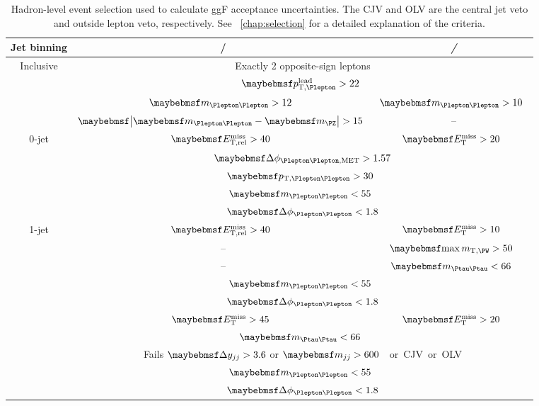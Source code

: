 \begin{table}
	\begin{tabular}{ccc}
		Jet binning & \ee/\mm & \em/\me \\
		\hline
		Inclusive & \multicolumn{2}{c}{Exactly 2 opposite-sign leptons} \\
		& \multicolumn{2}{c}{\unit{$\ptleadlep > 22$}{\GeV}} \\
		& \unit{$\mll > 12$}{\GeV} & \unit{$\mll > 10$}{\GeV} \\
		& \unit{$\mods{\mll - \mZ} > 15$}{\GeV} & -- \\
		\hline
		0-jet & \unit{$\metrel > 40$}{\GeV} & \unit{$\met > 20$}{\GeV} \\
		& \multicolumn{2}{c}{$\dphillmet > 1.57$} \\
		& \multicolumn{2}{c}{\unit{$\ptll > 30$}{\GeV}} \\
		& \multicolumn{2}{c}{\unit{$\mll < 55$}{\GeV}} \\
		& \multicolumn{2}{c}{$\dphill < 1.8$} \\
		\hline
		1-jet & \unit{$\metrel > 40$}{\GeV} & \unit{$\met > 10$}{\GeV} \\
		& -- & \unit{$\maxmtw > 50$}{\GeV} \\
		& -- & \unit{$\mtautau < 66$}{\GeV} \\
		& \multicolumn{2}{c}{\unit{$\mll < 55$}{\GeV}} \\
		& \multicolumn{2}{c}{$\dphill < 1.8$} \\
		\hline
		\twojet & \unit{$\met > 45$}{\GeV} & \unit{$\met > 20$}{\GeV} \\
		& \multicolumn{2}{c}{\unit{$\mtautau < 66$}{\GeV}} \\
		& \multicolumn{2}{c}{Fails $\dyjj > 3.6$ or \unit{$\mjj > 600$}{\GeV} or CJV or OLV} \\
		& \multicolumn{2}{c}{\unit{$\mll < 55$}{\GeV}} \\
		& \multicolumn{2}{c}{$\dphill < 1.8$} \\
	\end{tabular}
	\caption{Hadron-level event selection used to calculate ggF acceptance uncertainties. 
	The CJV and OLV are the central jet veto and outside lepton veto, respectively. See 
	\Chapter~\ref{chap:selection} for a detailed explanation of the criteria.}
	\label{tab:signal:acc_truthselection}
\end{table}

